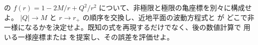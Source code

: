\begin{researchproblem}[極限地平面の散乱座標]
の
$f(r)=1-2M/r+Q^2/r^2$ について、非極限と極限の亀座標を別々に構成せよ。
$|Q|\to M$ と $r\to r_+$ の順序を交換し、近地平面の波動方程式と が
どこで非一様になるかを決定せよ。既知の式を再現するだけでなく、後の数値計算で
用いる一様座標または  を提案し、その誤差を評価せよ。
\end{researchproblem}
